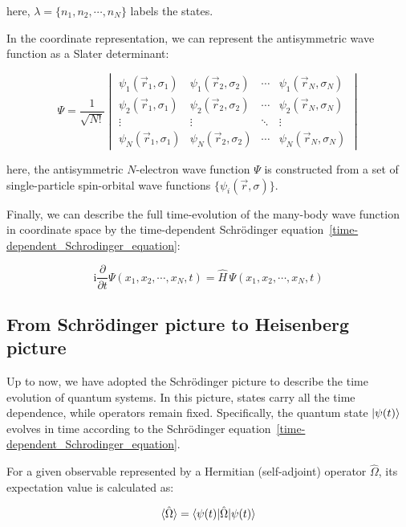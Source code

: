 here, $\lambda=\{n_1,n_2,\cdots,n_N\}$ labels the states.

In the coordinate representation, we can represent the antisymmetric wave function as a Slater determinant:

\begin{equation}
    \Psi = \frac{1}{\sqrt{N!}}
    \begin{vmatrix}
    \psi_1(\vec{r}_1,\sigma_1) & \psi_1(\vec{r}_2,\sigma_2) & \cdots & \psi_1(\vec{r}_N,\sigma_N)\\
    \psi_2(\vec{r}_1,\sigma_1) & \psi_2(\vec{r}_2,\sigma_2) & \cdots & \psi_2(\vec{r}_N,\sigma_N)\\
    \vdots & \vdots & \ddots & \vdots\\
    \psi_N(\vec{r}_1,\sigma_1) & \psi_N(\vec{r}_2,\sigma_2) & \cdots & \psi_N(\vec{r}_N,\sigma_N)
    \end{vmatrix}
\label{slater_determinant}
\end{equation}

here, the antisymmetric $N$-electron wave function $\Psi$ is constructed from a set of single-particle spin-orbital wave functions $\{\psi_i(\vec{r},\sigma)\}$.

Finally, we can describe the full time-evolution of the many-body wave function in coordinate space by the time-dependent Schrödinger equation~\eqref{time-dependent_Schrodinger_equation}:

\begin{equation}
    \mathrm{i}\frac{\partial}{\partial t}\Psi(x_1,x_2,\cdots,x_N,t)
    = \hat{H}\,\Psi(x_1,x_2,\cdots,x_N,t)
\label{tdse_manybody_coord}
\end{equation}

\FloatBarrier
\subsection{From Schrödinger picture to Heisenberg picture}

Up to now, we have adopted the Schrödinger picture to describe the time evolution of quantum systems. In this picture, states carry all the time dependence, while operators remain fixed. Specifically, the quantum state $\ket{\psi(t)}$ evolves in time according to the Schrödinger equation~\eqref{time-dependent_Schrodinger_equation}.

For a given observable represented by a Hermitian (self-adjoint) operator $\hat{\Omega}$, its expectation value is calculated as:

\begin{equation}
    \braket{\hat{\Omega}} = \braket{\psi(t)|\hat{\Omega}|\psi(t)}
\label{expectation_Hermitian}
\end{equation}

